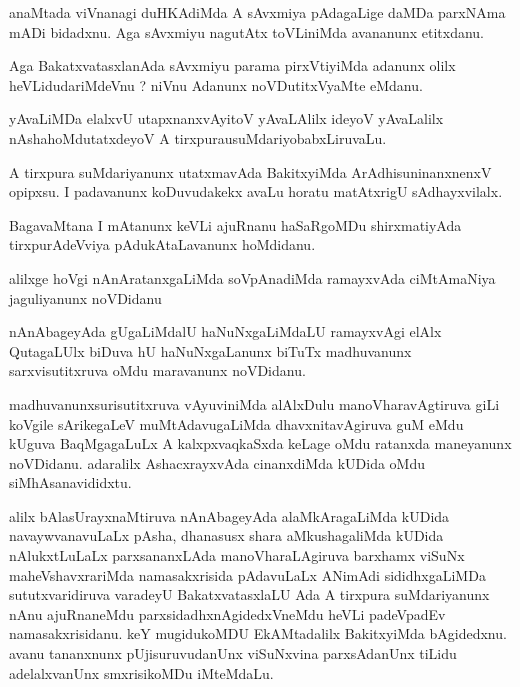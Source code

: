 \documentclass{article}
\begin{document}
\begin{mn}%
anaMtada viVnanagi duHKAdiMda A sAvxmiya pAdagaLige daMDa parxNAma mADi bidadxnu. Aga 
sAvxmiyu nagutAtx toVLiniMda avananunx etitxdanu.
\end{mn}

\begin{mn}%
Aga BakatxvatasxlanAda sAvxmiyu parama pirxVtiyiMda adanunx olilx heVLidudariMdeVnu ? 
niVnu Adanunx noVDutitxVyaMte eMdanu.
\end{mn}

\begin{mn}%
yAvaLiMDa elalxvU utapxnanxvAyitoV yAvaLAlilx ideyoV yAvaLalilx nAshahoMdutatxdeyoV A 
tirxpurausuMdariyobabxLiruvaLu.
\end{mn}

\begin{mn}%
A tirxpura suMdariyanunx utatxmavAda BakitxyiMda ArAdhisuninanxnenxV opipxsu. I padavanunx 
koDuvudakekx avaLu horatu matAtxrigU sAdhayxvilalx.
\end{mn}

\begin{mn}%
BagavaMtana I mAtanunx keVLi ajuRnanu haSaRgoMDu shirxmatiyAda tirxpurAdeVviya 
pAdukAtaLavanunx hoMdidanu.
\end{mn}

\begin{mn}%
alilxge hoVgi nAnAratanxgaLiMda soVpAnadiMda ramayxvAda ciMtAmaNiya jaguliyanunx noVDidanu
\end{mn}

\begin{mn}%
nAnAbageyAda gUgaLiMdalU haNuNxgaLiMdaLU ramayxvAgi elAlx QutagaLUlx biDuva hU 
haNuNxgaLanunx biTuTx madhuvanunx sarxvisutitxruva oMdu maravanunx noVDidanu.
\end{mn}

\begin{mn}%
madhuvanunxsurisutitxruva vAyuviniMda alAlxDulu manoVharavAgtiruva giLi koVgile sArikegaLeV 
muMtAdavugaLiMda dhavxnitavAgiruva guM eMdu kUguva BaqMgagaLuLx A kalxpxvaqkaSxda  keLage  
oMdu ratanxda maneyanunx noVDidanu. adaralilx AshacxrayxvAda cinanxdiMda kUDida oMdu 
siMhAsanavididxtu.
\end{mn}

\begin{mn}%
alilx bAlasUrayxnaMtiruva nAnAbageyAda alaMkAragaLiMda kUDida navaywvanavuLaLx pAsha, 
dhanasusx shara aMkushagaliMda kUDida nAlukxtLuLaLx parxsananxLAda manoVharaLAgiruva 
barxhamx viSuNx maheVshavxrariMda namasakxrisida pAdavuLaLx ANimAdi sididhxgaLiMDa 
sututxvaridiruva varadeyU BakatxvatasxlaLU Ada A tirxpura suMdariyanunx nAnu ajuRnaneMdu 
parxsidadhxnAgidedxVneMdu heVLi padeVpadEv namasakxrisidanu. keY mugidukoMDU EkAMtadalilx 
BakitxyiMda bAgidedxnu. avanu tananxnunx pUjisuruvudanUnx viSuNxvina parxsAdanUnx tiLidu 
adelalxvanUnx smxrisikoMDu iMteMdaLu.
\end{mn}
\end{document}
